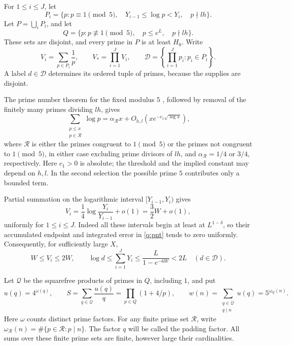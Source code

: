 For \(1\le i\le J\), let
\[
 P_i=\{p:p\equiv1\pmod5,\quad Y_{i-1}\le\log p<Y_i,\quad
                              p\nmid lh\}.
\]
Let \(P=\bigcup_iP_i\), and let
\[
 Q=\{p:p\not\equiv1\pmod5,\quad p\le e^L,\quad p\nmid lh\}.
\]
These sets are disjoint, and every prime in \(P\) is at least \(H_0\).
Write
\[
 V_i=\sum_{p\in P_i}\frac1p,\qquad V_*=\prod_{i=1}^J V_i,\qquad
 \mathcal D=\left\{\prod_{i=1}^J p_i:p_i\in P_i\right\}.
\]
A label \(d\in\mathcal D\) determines its ordered tuple of primes,
because the supplies are disjoint.

The prime number theorem for the fixed modulus \(5\)
\cite[Theorem~12.1]{Koukoulopoulos19}, followed by removal of the
finitely many primes dividing \(lh\), gives
\begin{equation}\label{q:pnt}
 \sum_{\substack{p\le x\\p\in\mathcal R}}\log p
 =\alpha_{\mathcal R}x+
 O_{h,l}\!\left(xe^{-c_1\sqrt{\log x}}\right),
\end{equation}
where \(\mathcal R\) is either the primes congruent to \(1\pmod5\)
or the primes not congruent to \(1\pmod5\), in either case excluding
prime divisors of \(lh\), and
\(\alpha_{\mathcal R}=1/4\) or \(3/4\), respectively.
Here \(c_1>0\) is absolute; the threshold and the implied constant
may depend on \(h,l\). In the second selection the possible prime
\(5\) contributes only a bounded term.

Partial summation on the logarithmic interval
\([Y_{i-1},Y_i)\) gives
\[
 V_i=\frac14\log\frac{Y_i}{Y_{i-1}}+o(1)
     =\frac32W+o(1),
\]
uniformly for \(1\le i\le J\). Indeed all these intervals begin at
least at \(L^{1-\delta}\), so their accumulated endpoint and
integrated error in \eqref{q:pnt} tends to zero uniformly.
Consequently, for sufficiently large \(X\),
\begin{equation}\label{q:prime-masses}
 W\le V_i\le2W,\qquad
 \log d\le\sum_{i=1}^JY_i
 \le \frac{L}{1-e^{-6W}}<2L\quad(d\in\mathcal D).
\end{equation}

Let \(\mathcal Q\) be the squarefree products of primes in \(Q\),
including \(1\), and put
\begin{equation}\label{q:padding-weights}
 u(q)=4^{\omega(q)},\qquad
 S=\sum_{q\in\mathcal Q}\frac{u(q)}q
   =\prod_{p\in Q}(1+4/p),\qquad
 w(n)=\sum_{\substack{q\in\mathcal Q\\q\mid n}}u(q)
   =5^{\omega_Q(n)}.
\end{equation}
Here \(\omega\) counts distinct prime factors. For any finite prime
set \(\mathcal R\), write
\(\omega_{\mathcal R}(n)=\#\{p\in\mathcal R:p\mid n\}\). The factor \(q\) will be
called the padding factor. All sums over these finite prime sets
are finite, however large their cardinalities.

